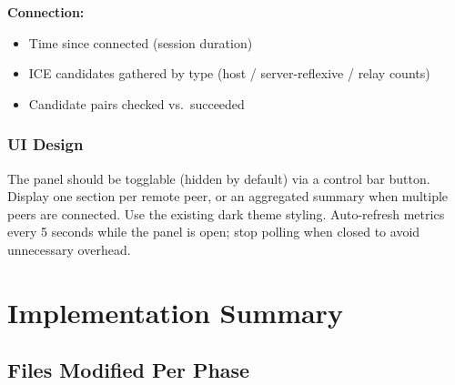 \documentclass[11pt,letterpaper]{article}
\begin{document}
\textbf{Connection:}
\begin{itemize}[leftmargin=2em]
    \item Time since connected (session duration)
    \item ICE candidates gathered by type (host / server-reflexive / relay counts)
    \item Candidate pairs checked vs.\ succeeded
\end{itemize}

\subsubsection{UI Design}

The panel should be togglable (hidden by default) via a control bar button. Display one section per remote peer, or an aggregated summary when multiple peers are connected. Use the existing dark theme styling. Auto-refresh metrics every 5 seconds while the panel is open; stop polling when closed to avoid unnecessary overhead.

\newpage

\section{Implementation Summary}

\subsection{Files Modified Per Phase}
\end{document}
